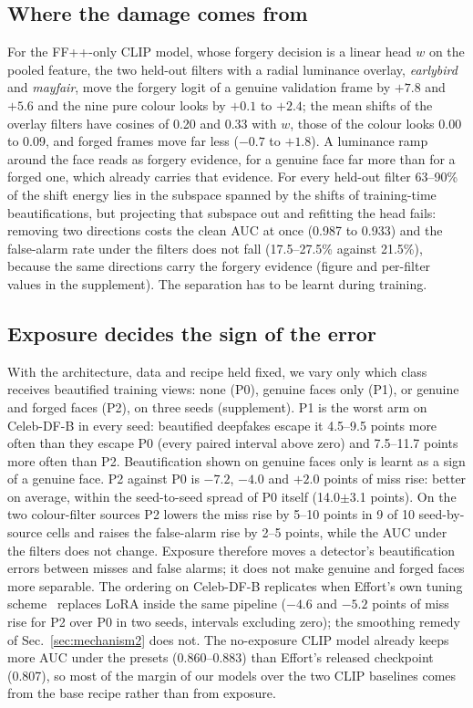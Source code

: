 \documentclass[conference]{IEEEtran}
\begin{document}
\subsection{Where the damage comes from}
\label{sec:mechanism}
For the FF++-only CLIP model, whose forgery decision is a linear head $w$ on the pooled feature, the two held-out
filters with a radial luminance overlay, \emph{earlybird} and \emph{mayfair}, move the forgery logit of a genuine
validation frame by $+7.8$ and $+5.6$ and the nine pure colour looks by $+0.1$ to $+2.4$; the mean shifts of the
overlay filters have cosines of 0.20 and 0.33 with $w$, those of the colour looks 0.00 to 0.09, and forged frames move
far less ($-0.7$ to $+1.8$). A luminance ramp around the face reads as forgery evidence, for a genuine face far more
than for a forged one, which already carries that evidence. For every held-out filter 63--90\% of the shift energy lies
in the subspace spanned by the shifts of training-time beautifications, but projecting that subspace out and refitting
the head fails: removing two directions costs the clean AUC at once (0.987 to 0.933) and the false-alarm rate under the
filters does not fall (17.5--27.5\% against 21.5\%), because the same directions carry the forgery evidence (figure and
per-filter values in the supplement). The separation has to be learnt during training.

\subsection{Exposure decides the sign of the error}
\label{sec:exposure}
With the architecture, data and recipe held fixed, we vary only which class receives beautified training views: none
(P0), genuine faces only (P1), or genuine and forged faces (P2), on three seeds (supplement). P1 is the worst arm on
Celeb-DF-B in every seed: beautified deepfakes escape it 4.5--9.5 points more often than they escape P0 (every paired
interval above zero) and 7.5--11.7 points more often than P2. Beautification shown on genuine faces only is learnt as a
sign of a genuine face. P2 against P0 is $-7.2$, $-4.0$ and $+2.0$ points of miss rise: better on average, within the
seed-to-seed spread of P0 itself (14.0$\pm$3.1 points). On the two colour-filter sources P2 lowers the miss rise by
5--10 points in 9 of 10 seed-by-source cells and raises the false-alarm rise by 2--5 points, while the AUC under the
filters does not change. Exposure therefore moves a detector's beautification errors between misses and false alarms;
it does not make genuine and forged faces more separable. The ordering on Celeb-DF-B replicates when Effort's own
tuning scheme~\cite{effort} replaces LoRA inside the same pipeline ($-4.6$ and $-5.2$ points of miss rise for P2 over
P0 in two seeds, intervals excluding zero); the smoothing remedy of Sec.~\ref{sec:mechanism2} does not. The no-exposure
CLIP model already keeps more AUC under the presets (0.860--0.883) than Effort's released checkpoint (0.807), so most
of the margin of our models over the two CLIP baselines comes from the base recipe rather than from exposure.
\end{document}
